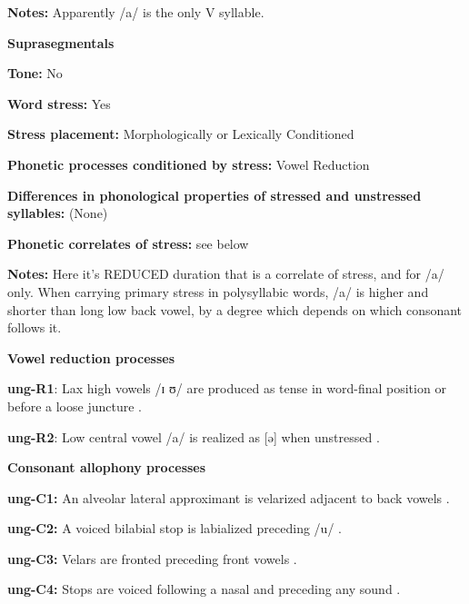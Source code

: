 \textbf{Notes:} Apparently /a/ is the only V syllable.



\textbf{Suprasegmentals}



\textbf{Tone:} No



\textbf{Word stress:} Yes



\textbf{Stress placement:} Morphologically or Lexically Conditioned



\textbf{Phonetic processes conditioned by stress:} Vowel Reduction



\textbf{Differences in phonological properties of stressed and unstressed syllables:} (None)



\textbf{Phonetic correlates of stress:} see below



\textbf{Notes:} Here it’s REDUCED duration that is a correlate of stress, and for /a/ only. When carrying primary stress in polysyllabic words, /a/ is higher and shorter than long low back vowel, by a degree which depends on which consonant follows it.



\textbf{Vowel reduction processes}



\textbf{ung-R1}: Lax high vowels /ɪ ʊ/ are produced as tense in word-final position or before a loose juncture \citep[13-16]{Rumsey1978}.



\textbf{ung-R2}: Low central vowel /a/ is realized as [ə] when unstressed \citep[17-18]{Rumsey1978}.



\textbf{Consonant allophony processes}



\textbf{ung-C1:} An alveolar lateral approximant is velarized adjacent to back vowels \citep[11]{Rumsey1978}.



\textbf{ung-C2:} A voiced bilabial stop is labialized preceding /u/ \citep[9-10]{Rumsey1978}.



\textbf{ung-C3:} Velars are fronted preceding front vowels \citep[11]{Rumsey1978}.



\textbf{ung-C4:} Stops are voiced following a nasal and preceding any sound \citep[9]{Rumsey1978}.



